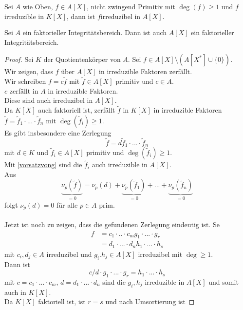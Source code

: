 	\begin{bem*}
		Sei $A$ wie Oben, $f\in A[X]$, nicht zwingend Primitiv mit $\deg(f)\geq1$ und $f$ irreduzible in $K[X]$, dann ist $f$irreduzibel in $A[X]$.
	\end{bem*}

	\begin{theorem}
		Sei $A$ ein faktorieller Integritätsbereich. Dann ist auch $A[X]$ ein faktorieller Integritätsbereich.
	\end{theorem}
	\begin{proof}
		Sei $K$ der Quotientenkörper von $A$. Sei $f\in A[X]\setminus(A[X^*]\cup\{0\})$.\\
		Wir zeigen, dass $f$ über $A[X]$ in irreduzible Faktoren zerfällt.\\
		Wir schreiben $f=c\tilde f$ mit $\tilde f\in A[X]$ primitiv und $c\in A$.\\
		$c$ zerfällt in $A$ in irreduzible Faktoren.\\
		Diese sind auch irreduzibel in $A[X]$.\\
		Da $K[X]$ auch faktoriell ist, zerfällt $\tilde f$ in $K[X]$ in irreduzible Faktoren $\tilde f=\tilde f_1\cdot...\cdot\tilde f_n$ mit $\deg(\tilde f_i)\geq 1$.\\
		Es gibt insbesondere eine Zerlegung
		\[\tilde f=d\tilde f_1\cdot...\cdot \tilde f_n\]
		mit $d\in K$ und $\tilde f_i\in A[X]$ primitiv und $\deg(\tilde f_i)\geq 1$.\\
		Mit \ref{vorsatzvong} sind die $\tilde f_i$ auch irreduzible in $A[X]$.\\
		Aus
		\[\underbrace{\nu_p(\tilde f)}_{=0}=\nu_p(d)+\underbrace{\nu_p(\tilde f_1)}_{=0}+...+\underbrace{\nu_p(\tilde f_n)}_{=0}\]
		folgt $\nu_p(d)=0$ für alle $p\in A$ prim.\\
		\\
		Jetzt ist noch zu zeigen, dass die gefundenen Zerlegung eindeutig ist. Se
		\begin{align*}
		f&=c_1\cdot..\cdot c_mg_1\cdot...\cdot g_r\\
		&=d_1\cdot...\cdot d_nh_1\cdot ...\cdot h_s
		\end{align*}
		mit $c_i,d_j\in A$ irreduzibel und $g_i.h_j\in A[X]$ irreduzibel mit $\deg\geq 1$.\\
		Dann ist
		\[c/d\cdot g_1\cdot...\cdot g_r=h_1\cdot...\cdot h_s\]
		mit $c=c_1\cdot...\cdot c_m$, $d=d_1\cdot...\cdot d_n$ sind die $g_i,h_j$ irreduzible in $A[X]$ und somit auch in $K[X]$.\\
		Da $K[X]$ faktoriell ist, ist $r=s$ und nach Umsortierung ist

\end{proof}
